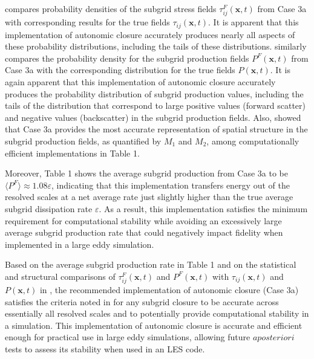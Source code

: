  compares probability densities of the subgrid stress fields $\tau_{ij}^{F}(\mathbf{x},t)$  from Case 3a with corresponding results for the true fields $\tau_{ij}(\mathbf{x},t)$. It is apparent that this implementation of autonomic closure accurately produces nearly all aspects of these probability distributions, including the tails of these distributions.  similarly compares the probability density for the subgrid production fields $P^{F}(\mathbf{x},t)$  from Case 3a with the corresponding distribution for the true fields $P(\mathbf{x},t)$. It is again apparent that this implementation of autonomic closure accurately produces the probability distribution of subgrid production values, including the tails of the distribution that correspond to large positive values (forward scatter) and negative values (backscatter) in the subgrid production fields. Also,  showed that Case 3a provides the most accurate representation of spatial structure in the subgrid production fields, as quantified by  $M_1$ and $M_2$, among computationally efficient implementations in Table 1. 

Moreover, Table 1 shows the average subgrid production from Case 3a to be $\langle P^F \rangle \approx 1.08 \varepsilon$, indicating that this implementation transfers energy out of the resolved scales at a net average rate just slightly higher than the true average subgrid dissipation rate $\varepsilon$. As a result, this implementation satisfies the minimum requirement for computational stability while avoiding an excessively large average subgrid production rate that could negatively impact fidelity when implemented in a large eddy simulation.

Based on the average subgrid production rate in Table 1 and on the statistical and structural comparisons of  $\tau_{ij}^{F}(\mathbf{x},t)$ and $P^{F}(\mathbf{x},t)$  with  $\tau_{ij}(\mathbf{x},t)$ and  $P(\mathbf{x},t)$ in , the recommended implementation of autonomic closure (Case 3a) satisfies the criteria noted in  for any subgrid closure to be accurate across essentially all resolved scales and to potentially provide computational stability in a simulation. This implementation of autonomic closure is accurate and efficient enough for practical use in large eddy simulations, allowing future $a posteriori$ tests to assess its stability when used in an LES code.




